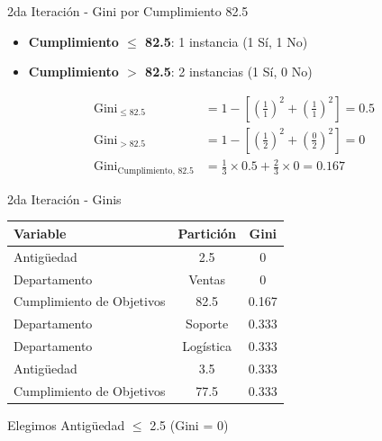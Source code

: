 \documentclass{beamer}
\begin{document}
\begin{frame}{2da Iteración - Gini por Cumplimiento 82.5}
    \begin{itemize}
        \item \textbf{Cumplimiento $\leq$ 82.5}: 1 instancia (1 Sí, 1 No)
        \item \textbf{Cumplimiento $>$ 82.5}: 2 instancias (1 Sí, 0 No)
    \end{itemize}
    
    \vspace{0.5em}
    
    \begin{align*}
        \mathrm{Gini}_{\leq 82.5} &= 1 - \left[\left(\tfrac{1}{1}\right)^2 + \left(\tfrac{1}{1}\right)^2\right] = 0.5 \\
        \mathrm{Gini}_{> 82.5} &= 1 - \left[\left(\tfrac{1}{2}\right)^2 + \left(\tfrac{0}{2}\right)^2\right] = 0 \\
        \mathrm{Gini}_{\text{Cumplimiento, 82.5}} &= \tfrac{1}{3}\times0.5 + \tfrac{2}{3}\times0 = 0.167
    \end{align*}
\end{frame}

\begin{frame}{2da Iteración - Ginis}
    \begin{center}
        \begin{tabular}{lcc}
            \toprule
            Variable & Partición & Gini \\
            \midrule
            Antigüedad & 2.5 & 0 \\
            Departamento & Ventas & 0 \\
            Cumplimiento de Objetivos & 82.5 & 0.167 \\
            Departamento & Soporte & 0.333 \\
            Departamento & Logística & 0.333 \\
            Antigüedad & 3.5 & 0.333 \\
            Cumplimiento de Objetivos & 77.5 & 0.333 \\
            \bottomrule
        \end{tabular}
    \end{center}
    
    \vspace{1em}
    
    \begin{center}
        \Large Elegimos Antigüedad $\leq$ 2.5 (Gini = 0)
    \end{center}
\end{frame}
\end{document}

